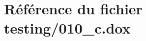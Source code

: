 \hypertarget{010__c_8dox}{}\section{Référence du fichier testing/010\+\_\+c.dox}
\label{010__c_8dox}
